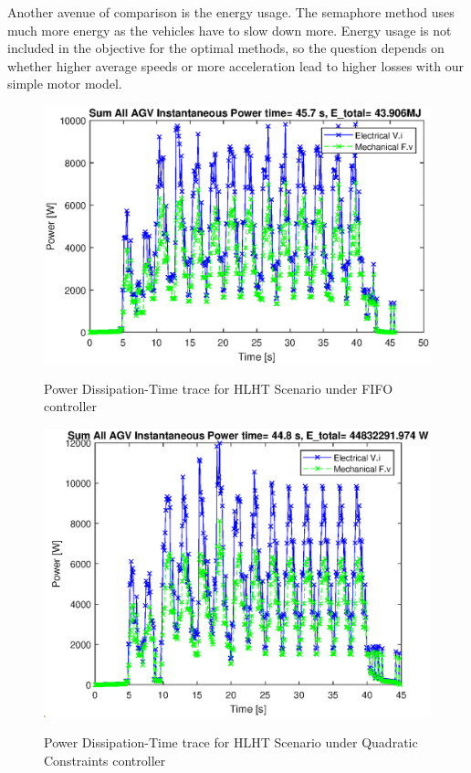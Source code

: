 Another avenue of comparison is the energy usage. The semaphore method uses much more energy as the vehicles have to slow down more. Energy usage is not included in the objective for the optimal methods, so the question depends on whether higher average speeds or more acceleration lead to higher losses with our simple motor model.
\begin{figure}
\includegraphics[width=1.0\linewidth]{results_fig/FIFO-HTHL_power_sum-t.eps}
\label{fig:fifo_hlht_pow}
\caption{Power Dissipation-Time trace for HLHT Scenario under FIFO controller}
\end{figure}
\begin{figure}
\includegraphics[width=1.0\linewidth]{results_fig/IC-QuadConstr_HLHT_powersum-t.eps}
\label{fig:quad_hlht_pow}
\caption{Power Dissipation-Time trace for HLHT Scenario under Quadratic Constraints controller}
\end{figure}
